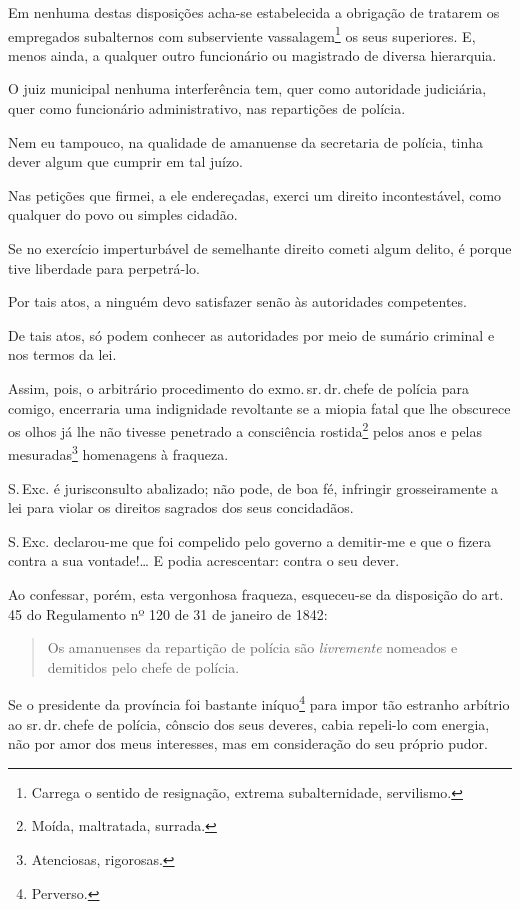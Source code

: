 Em nenhuma destas disposições acha-se estabelecida a obrigação de
tratarem os empregados subalternos com subserviente
vassalagem\footnote{Carrega o sentido de resignação, extrema
  subalternidade, servilismo.} os seus superiores. E, menos ainda, a
qualquer outro funcionário ou magistrado de diversa hierarquia.

O juiz municipal nenhuma interferência tem, quer como autoridade
judiciária, quer como funcionário administrativo, nas repartições de
polícia.

Nem eu tampouco, na qualidade de amanuense da secretaria de polícia,
tinha dever algum que cumprir em tal juízo.

Nas petições que firmei, a ele endereçadas, exerci um direito
incontestável, como qualquer do povo ou simples cidadão.

Se no exercício imperturbável de semelhante direito cometi algum delito,
é porque tive liberdade para perpetrá-lo.

Por tais atos, a ninguém devo satisfazer senão às autoridades
competentes.

De tais atos, só podem conhecer as autoridades por meio de sumário
criminal e nos termos da lei.

Assim, pois, o arbitrário procedimento do exmo.\,sr.\,dr.\,chefe de polícia
para comigo, encerraria uma indignidade revoltante se a miopia fatal que
lhe obscurece os olhos já lhe não tivesse penetrado a consciência
rostida\footnote{Moída, maltratada, surrada.} pelos anos e pelas
mesuradas\footnote{Atenciosas, rigorosas.} homenagens à fraqueza.

S.\,Exc. é jurisconsulto abalizado; não pode, de boa fé, infringir
grosseiramente a lei para violar os direitos sagrados dos seus
concidadãos.

S.\,Exc. declarou-me que foi compelido pelo governo a demitir-me e que o
fizera contra a sua vontade!\ldots{} E podia acrescentar: contra o seu dever.

Ao confessar, porém, esta vergonhosa fraqueza, esqueceu-se da disposição
do art. 45 do Regulamento nº 120 de 31 de janeiro de 1842:

\begin{quote}
Os amanuenses da repartição de polícia são \emph{livremente} nomeados e
demitidos pelo chefe de polícia.
\end{quote}

Se o presidente da província foi bastante iníquo\footnote{Perverso.}
para impor tão estranho arbítrio ao sr.\,dr.\,chefe de polícia, cônscio
dos seus deveres, cabia repeli-lo com energia, não por amor dos meus
interesses, mas em consideração do seu próprio pudor.

